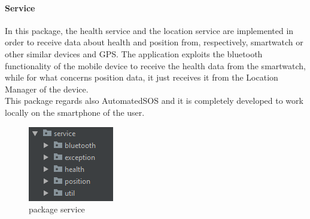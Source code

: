 \paragraph{Service}
In this package, the health service and the location service are implemented in order to receive data about health and position 
from, respectively, smartwatch or other similar devices and GPS. 
The application exploits the bluetooth functionality of the mobile device to receive the health data from the smartwatch, while for what 
concerns position data, it just receives it from the Location Manager of the device.\\

This package regards also AutomatedSOS and it is completely developed to work locally on the smartphone of the user. 

\begin{figure}[H]
\includegraphics[width=0.6\linewidth]{images/Service.png}
\caption{ package service }
\label{fig:pkgsharedata}
\end{figure}

